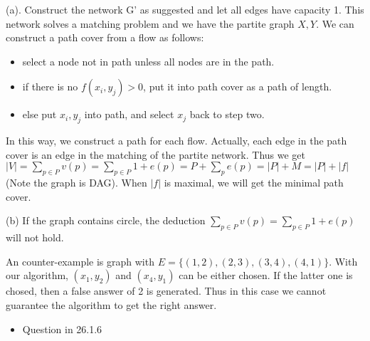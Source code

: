 \begin{psproblem}[26-2]
\end{psproblem}
\begin{pssolution}
    (a). Construct the network G' as suggested and let all edges have capacity 1. This network solves a matching problem and we have the partite graph $X,Y$. We can construct a path cover from a flow as follows:
    \begin{itemize}
        \item select a node not in path unless all nodes are in the path.
        \item if there is no $f(x_i,y_j)>0$, put it into path cover as a path of length.
        \item else put $x_i,y_j$ into path, and select $x_j$ back to step two.
    \end{itemize}

    In this way, we construct a path for each flow. Actually, each edge in the path cover is an edge in the matching of the partite network. Thus we get $|V|=\sum_{p\in P}{v(p)}=\sum_{p\in P}{1+e(p)}=P+\sum_{p}{e(p)}=|P|+M=|P|+|f|$(Note the graph is DAG). When $|f|$ is maximal, we will get the minimal path cover.

    (b) If the graph contains circle, the deduction $\sum_{p\in P}{v(p)}=\sum_{p\in P}{1+e(p)}$ will not hold.
    
    An counter-example is graph with $E=\{(1,2),(2,3),(3,4),(4,1)\}$. With our algorithm, $(x_1,y_2)$ and $(x_4,y_1)$ can be either chosen. If the latter one is chosed, then a false answer of 2 is generated. Thus in this case we cannot guarantee the algorithm to get the right answer.
\end{pssolution}


\pscr

\psfb
\begin{itemize}
    \item Question in 26.1.6
\end{itemize}